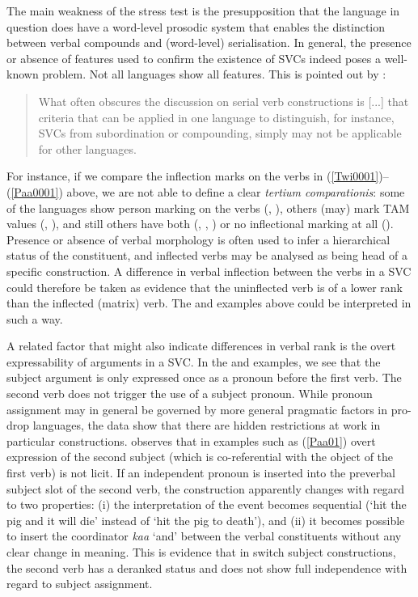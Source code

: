 The main weakness of the stress test is the presupposition that the language in question does have a word-level prosodic system that enables the distinction between verbal compounds and (word-level) serialisation. In general, the presence or absence of features used to confirm the existence of SVCs indeed poses a well-known problem. Not all languages show all features. This is pointed out by \citet[22]{vanstaden2008serial}: 

\begin{quote}What often obscures the discussion on serial verb constructions is [...] that criteria that can be applied in one language to distinguish, for instance, SVCs from subordination or compounding, simply may not be applicable for other languages.\end{quote}

For instance, if we compare the inflection marks on the verbs in (\ref{Twi0001})--(\ref{Paa0001}) above, we are not able to define a clear \textit{tertium comparationis}: some of the languages show person marking on the verbs (, ), others (may) mark TAM values (, ), and still others have both (, , ) or no inflectional marking at all (). Presence or absence of verbal morphology is often used to infer a hierarchical status of the constituent, and inflected verbs may be analysed as being head of a specific construction. A difference in verbal inflection between the verbs in a SVC could therefore be taken as evidence that the uninflected verb is of a lower rank than the inflected (matrix) verb. The  and  examples above could be interpreted in such a way. 

A related factor that might also indicate differences in verbal rank is the overt expressability of arguments in a SVC. In the  and  examples, we see that the subject argument is only expressed once as a pronoun before the first verb. The second verb does not trigger the use of a subject pronoun. While pronoun assignment may in general be governed by more general pragmatic factors in pro-drop languages, the  data show that there are hidden restrictions at work in particular constructions. \citet{crowley2002serial} observes that in examples such as (\ref{Paa01}) overt expression of the second subject (which is co-referential with the object of the first verb) is not licit. If an independent pronoun is inserted into the preverbal subject slot of the second verb, the construction apparently changes with regard to two properties: (i) the interpretation of the event becomes sequential (`hit the pig and it will die' instead of `hit the pig to death'), and (ii) it becomes possible to insert the coordinator \textit{kaa} `and' between the verbal constituents without any clear change in meaning. This is evidence that in  switch subject constructions, the second verb has a deranked status and does not show full independence with regard to subject assignment.

